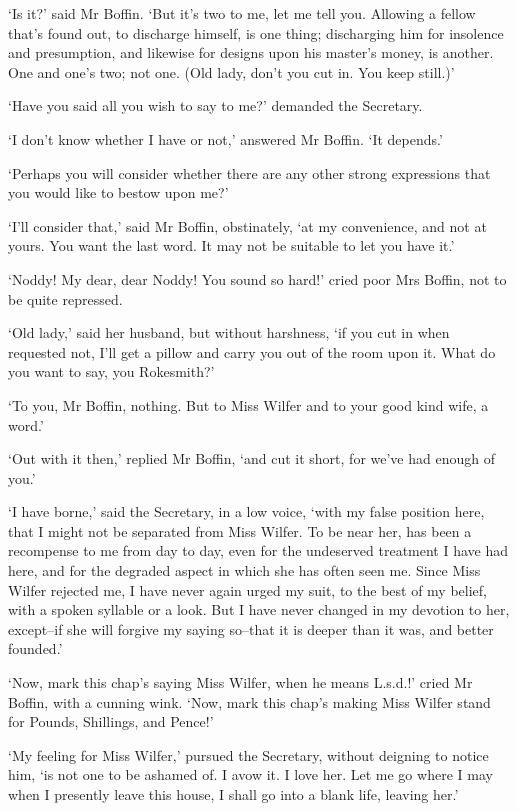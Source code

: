 ‘Is it?’ said Mr Boffin. ‘But it’s two to me, let me tell you.
Allowing a fellow that’s found out, to discharge himself, is one thing;
discharging him for insolence and presumption, and likewise for designs
upon his master’s money, is another. One and one’s two; not one. (Old
lady, don’t you cut in. You keep still.)’

‘Have you said all you wish to say to me?’ demanded the Secretary.

‘I don’t know whether I have or not,’ answered Mr Boffin. ‘It depends.’

‘Perhaps you will consider whether there are any other strong
expressions that you would like to bestow upon me?’

‘I’ll consider that,’ said Mr Boffin, obstinately, ‘at my convenience,
and not at yours. You want the last word. It may not be suitable to let
you have it.’

‘Noddy! My dear, dear Noddy! You sound so hard!’ cried poor Mrs Boffin,
not to be quite repressed.

‘Old lady,’ said her husband, but without harshness, ‘if you cut in when
requested not, I’ll get a pillow and carry you out of the room upon it.
What do you want to say, you Rokesmith?’

‘To you, Mr Boffin, nothing. But to Miss Wilfer and to your good kind
wife, a word.’

‘Out with it then,’ replied Mr Boffin, ‘and cut it short, for we’ve had
enough of you.’

‘I have borne,’ said the Secretary, in a low voice, ‘with my false
position here, that I might not be separated from Miss Wilfer. To be
near her, has been a recompense to me from day to day, even for the
undeserved treatment I have had here, and for the degraded aspect in
which she has often seen me. Since Miss Wilfer rejected me, I have never
again urged my suit, to the best of my belief, with a spoken syllable or
a look. But I have never changed in my devotion to her, except--if she
will forgive my saying so--that it is deeper than it was, and better
founded.’

‘Now, mark this chap’s saying Miss Wilfer, when he means L.s.d.!’ cried
Mr Boffin, with a cunning wink. ‘Now, mark this chap’s making Miss
Wilfer stand for Pounds, Shillings, and Pence!’

‘My feeling for Miss Wilfer,’ pursued the Secretary, without deigning to
notice him, ‘is not one to be ashamed of. I avow it. I love her. Let
me go where I may when I presently leave this house, I shall go into a
blank life, leaving her.’

